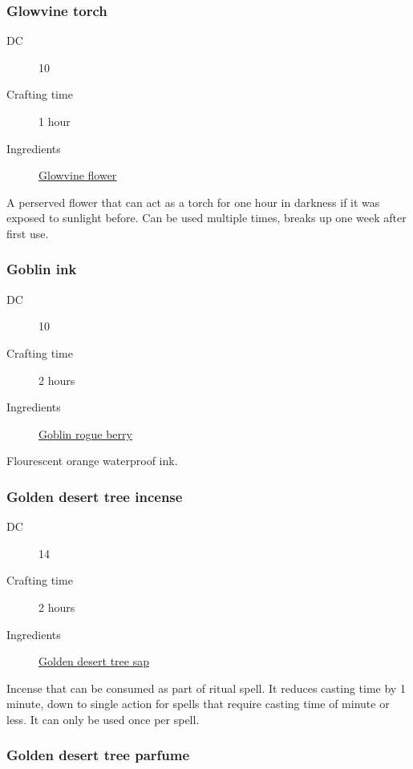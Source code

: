 \subsubsection{Glowvine torch}
\label{Glowvine torch}

\begin{description}
\item [DC] 10
\item [Crafting time] 1 hour
\item [Ingredients] \hyperref[Glowvine]{Glowvine flower}
\end{description}

A perserved flower that can act as a torch for one hour in darkness if it was exposed to sunlight before. 
Can be used multiple times, breaks up one week after first use.

\subsubsection{Goblin ink}
\label{Goblin ink}

\begin{description}
\item [DC] 10
\item [Crafting time] 2 hours
\item [Ingredients] \hyperref[Goblin Rogue]{Goblin rogue berry}
\end{description}

Flourescent orange waterproof ink.

\subsubsection{Golden desert tree incense}
\label{Golden desert tree incense}

\begin{description}
\item [DC] 14
\item [Crafting time] 2 hours
\item [Ingredients] \hyperref[Golden Desert Tree]{Golden desert tree sap}
\end{description}

Incense that can be consumed as part of ritual spell. It reduces casting time by 1 minute, down to single action for spells that require casting time of minute or less. It can only be used once per spell.

\subsubsection{Golden desert tree parfume}
\label{Golden desert tree parfume}

